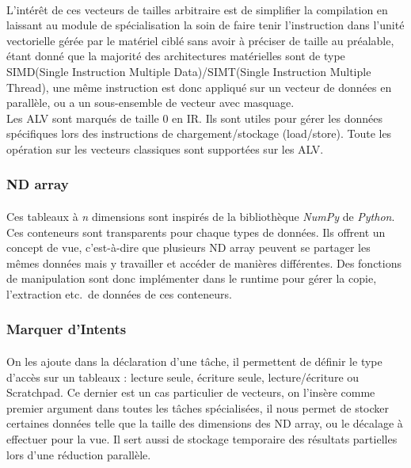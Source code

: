 \paragraph{}
L'intérêt de ces vecteurs de tailles arbitraire est de simplifier la compilation
en laissant au module de spécialisation la soin de faire tenir l'instruction
dans l'unité vectorielle gérée par le matériel ciblé sans avoir à préciser de
taille au préalable, étant donné que la majorité des architectures matérielles
sont de type SIMD(Single Instruction Multiple Data)/SIMT(Single Instruction
Multiple Thread), une même instruction est donc appliqué sur un vecteur de
données en parallèle, ou a un sous-ensemble de vecteur avec masquage.\\
Les ALV sont marqués de taille 0 en IR. Ils sont utiles pour gérer les données
spécifiques lors des instructions de chargement/stockage (load/store). Toute les
opération sur les vecteurs classiques sont supportées sur les ALV.

\subsubsection{ND array}
\paragraph{}
Ces tableaux à \emph{n} dimensions sont inspirés de la bibliothèque \emph{NumPy}
de \emph{Python}. Ces conteneurs sont transparents pour chaque types de données.
Ils offrent un concept de vue, c'est-à-dire que plusieurs ND array peuvent se
partager les mêmes données mais y travailler et accéder de manières différentes.
Des fonctions de manipulation sont donc implémenter dans le runtime pour gérer
la copie, l'extraction etc.\ de données de ces conteneurs.

\subsubsection{Marquer d'Intents}
\paragraph{}
On les ajoute dans la déclaration d'une tâche, il permettent de définir le type
d'accès sur un tableaux : lecture seule, écriture seule, lecture/écriture ou
Scratchpad. Ce dernier est un cas particulier de vecteurs, on l'insère comme
premier argument dans toutes les tâches spécialisées, il nous permet de stocker
certaines données telle que la taille des dimensions des ND array, ou le
décalage à effectuer pour la vue. Il sert aussi de stockage temporaire des
résultats partielles lors d'une réduction parallèle.

